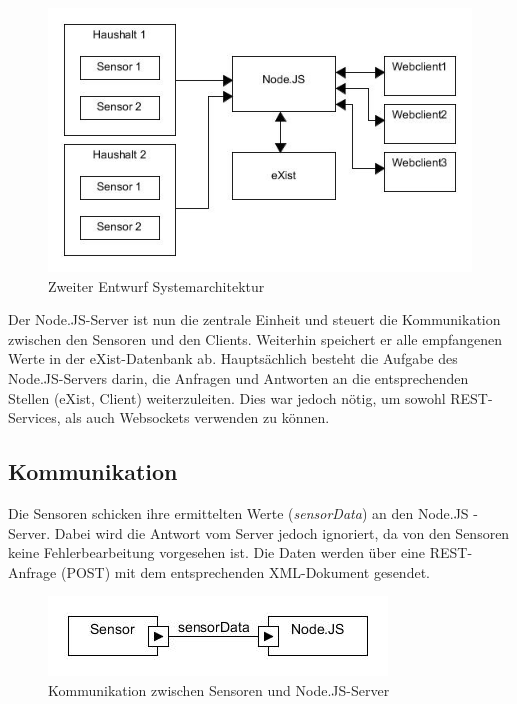 \begin{figure}[h]
\begin{center}
\includegraphics[scale=0.7]{images/sa2.jpg} 
\caption{Zweiter Entwurf Systemarchitektur}
\end{center}
\end{figure}

Der Node.JS-Server ist nun die zentrale Einheit und steuert die Kommunikation zwischen den Sensoren und den Clients. Weiterhin speichert er alle empfangenen Werte in der eXist-Datenbank ab. Hauptsächlich besteht die Aufgabe des Node.JS-Servers darin, die Anfragen und Antworten an die entsprechenden Stellen (eXist, Client) weiterzuleiten. Dies war jedoch nötig, um sowohl REST-Services, als auch Websockets verwenden zu können.

\subsection{Kommunikation}
Die Sensoren schicken ihre ermittelten Werte (\textit{sensorData}) an den Node.JS -Server. Dabei wird die Antwort vom Server jedoch ignoriert, da von den Sensoren keine  Fehlerbearbeitung vorgesehen ist. Die Daten werden über eine REST-Anfrage (POST) mit dem entsprechenden XML-Dokument gesendet.

\begin{figure}[h]
\begin{center}
\includegraphics[scale=0.8]{images/komm1.jpg} 
\caption{Kommunikation zwischen Sensoren und Node.JS-Server}
\end{center}
\end{figure}


